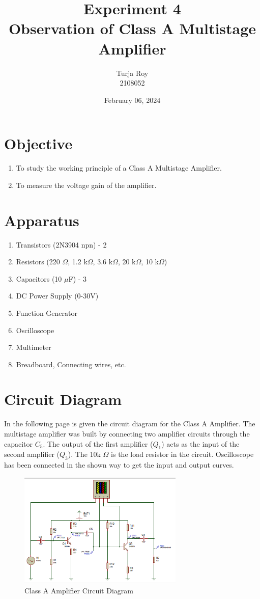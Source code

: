 \documentclass[12pt]{article}
\title{
    \textbf{Experiment 4}\\
    \textbf{Observation of Class A Multistage Amplifier}
}
\author{
    Turja Roy\\
    2108052
}
\date{February 06, 2024}
\begin{document}
\maketitle

\section{Objective}
\begin{enumerate}
    \item To study the working principle of a Class A Multistage Amplifier.
    \item To measure the voltage gain of the amplifier.
\end{enumerate}

\section{Apparatus}
\begin{enumerate}
    \item Transistors (2N3904 npn) - 2
    \item Resistors (220 $\Omega$, 1.2 k$\Omega$, 3.6 k$\Omega$, 20 k$\Omega$, 10 k$\Omega$)
    \item Capacitors (10 $\mu$F) - 3
    \item DC Power Supply (0-30V)
    \item Function Generator
    \item Oscilloscope
    \item Multimeter
    \item Breadboard, Connecting wires, etc.
\end{enumerate}

\section{Circuit Diagram}
In the following page is given the circuit diagram for the Class A Amplifier. The multistage amplifier was built by connecting two amplifier circuits through the capacitor $C_5$. The output of the first amplifier ($Q_1$) acts as the input of the second amplifier ($Q_3$). The 10k $\Omega$ is the load resistor in the circuit. Oscilloscope has been connected in the shown way to get the input and output curves.

\begin{figure}[!htpb]
    \centering
    \includegraphics[width=0.7\textwidth]{Circuit Diagram.png}
    \caption{Class A Amplifier Circuit Diagram}
\end{figure}
\end{document}
